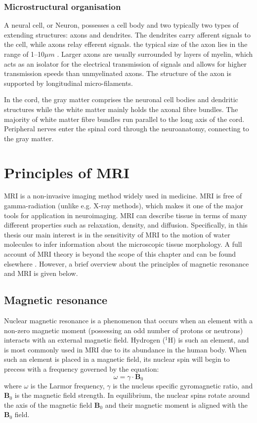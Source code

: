 \subsubsection{Microstructural organisation}
A neural cell, or Neuron, possesses a cell body and two typically two types of extending structures: axons and dendrites. The dendrites carry afferent signals to the cell, while axons relay efferent signals. the typical size of the axon lies in the range of 1--10$\mu m$ \citep{Waxman:1989,Beaulieu:2002}. Larger axons are usually surrounded by layers of myelin, which acts as an isolator for the electrical transmission of signals and allows for higher transmission speeds than unmyelinated axons. The structure of the axon is supported by longitudinal micro-filaments\citep{Beaulieu:2002}.

In the cord, the gray matter comprises the neuronal cell bodies and dendritic structures while the white matter mainly holds the axonal fibre bundles. The majority of white matter fibre bundles run parallel to the long axis of the cord. Peripheral nerves enter the spinal cord through the neuroanatomy, connecting to the gray matter\citep{Carpenter:1991}. 

\section{Principles of MRI}
\Gls{MRI} is a non-invasive imaging method widely used in medicine. \gls{MRI} is free of gamma-radiation (unlike e.g. X-ray methods), which makes it one of the major tools for application in neuroimaging. \Gls{MRI} can describe tissue in terms of many different properties such as relaxation, density, and diffusion. Specifically, in this thesis our main interest is in the sensitivity of MRI to the motion of water molecules to infer information about the microscopic tissue morphology. A full account of \gls{MRI} theory is beyond the scope of this chapter and can be found elsewhere \citep{McRobbie:2002,Bernstein:2004}. However, a brief overview about the principles of magnetic resonance and \gls{MRI} is given below.

\subsection{Magnetic resonance}
Nuclear magnetic resonance is a phenomenon that occurs when an element with a non-zero magnetic moment (possessing an odd number of protons or neutrons) interacts with an external magnetic field. Hydrogen ($^1$H) is such an element, and is most commonly used in MRI due to its abundance in the human body. When such an element is placed in a magnetic field, its nuclear spin will begin to precess with a frequency governed by the equation:
\begin{equation}
\omega =\gamma \cdot \mathbf{B}_0 
\end{equation}
where $\omega$ is the Larmor frequency, $\gamma$ is the nucleus specific gyromagnetic ratio, and $\mathbf{B}_0$ is the magnetic field strength. In equilibrium, the nuclear spins rotate around the axis of the magnetic field $\mathbf{B}_0$ and their magnetic moment is aligned with the $\mathbf{B}_0$ field. 

